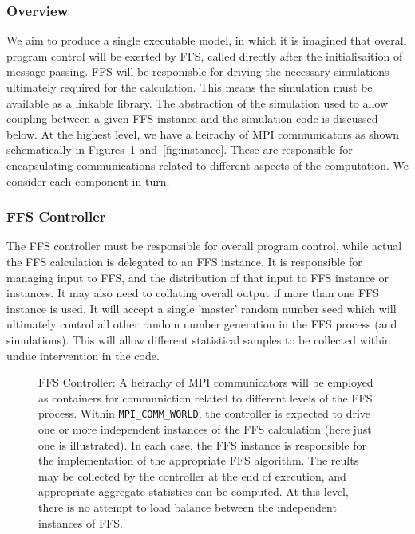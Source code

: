\documentclass[11pt]{article}
\begin{document}
\subsubsection{Overview}

We aim to produce a single executable model, in which it is imagined
that overall program control will be exerted by FFS, called directly
after the initialisaition of message passing. FFS will be responisble
for driving the necessary simulations ultimately required for the
calculation. This means the simulation must be available as a
linkable library. The abstraction of the simulation used to allow
coupling between a given FFS instance and the simulation code is discussed
below. At the highest level, we have a heirachy of MPI communicators
as shown schematically in Figures~\ref{fig:controller} and~\ref{fig:instance}.
These are responsible for encapsulating communications related to different
aspects of the computation. We consider each component in turn.

\subsubsection{FFS Controller}

The FFS controller must be responsible for overall program control,
while actual the FFS calculation is delegated to an FFS instance.
It is responsible for managing input to FFS, and the distribution
of that input to FFS instance or instances. It may also need to
collating overall output if more than one FFS instance is used.
It will accept a single 'master' random number seed which will
ultimately control all other random number generation in the FFS
process (and simulations). This will allow different statistical
samples to be collected within undue intervention in the code.



\begin{figure}[t]
\label{fig:controller}
\begin{center}

\end{center}
\caption{FFS Controller: A heirachy of MPI communicators will be
employed as containers for communiction related to different
levels of the FFS process. Within \texttt{MPI\_COMM\_WORLD},
the controller is expected to drive one or more independent
instances of the FFS calculation (here just one is illustrated).
In each case, the FFS instance is responsible for the implementation
of the appropriate FFS algorithm. The reults may be collected by the
controller at the end of execution, and appropriate aggregate
statistics can be computed. At this level, there is no attempt
to load balance between the independent instances of FFS.}
\end{figure}
\end{document}
